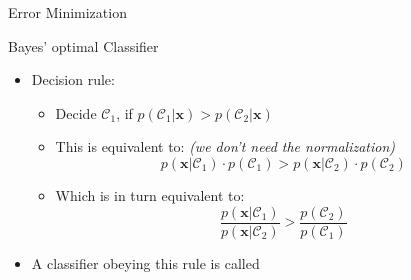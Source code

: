 \begin{frame}{Error Minimization}{}
\end{frame}


\begin{frame}{Bayes' optimal Classifier}{}\important
	\begin{itemize}
		\item Decision rule:
		\begin{itemize}
			\item Decide $\mathcal{C}_1$, if $p(\mathcal{C}_1 \vert \bm{x}) > p(\mathcal{C}_2 \vert \bm{x})$
			\item This is equivalent to: \textit{(we don't need the normalization)}
			\begin{equation}
				p(\bm{x} \vert \mathcal{C}_1) \cdot p(\mathcal{C}_1) >
					p(\bm{x} \vert \mathcal{C}_2) \cdot p(\mathcal{C}_2)
			\end{equation} 
			\item Which is in turn equivalent to:
			\begin{equation}
				\frac{p(\bm{x} \vert \mathcal{C}_1)}{p(\bm{x} \vert \mathcal{C}_2)} >
					\frac{p(\mathcal{C}_2)}{p(\mathcal{C}_1)}
			\end{equation}
		\end{itemize}
		\item A classifier obeying this rule is called 
	\end{itemize}
\end{frame}


